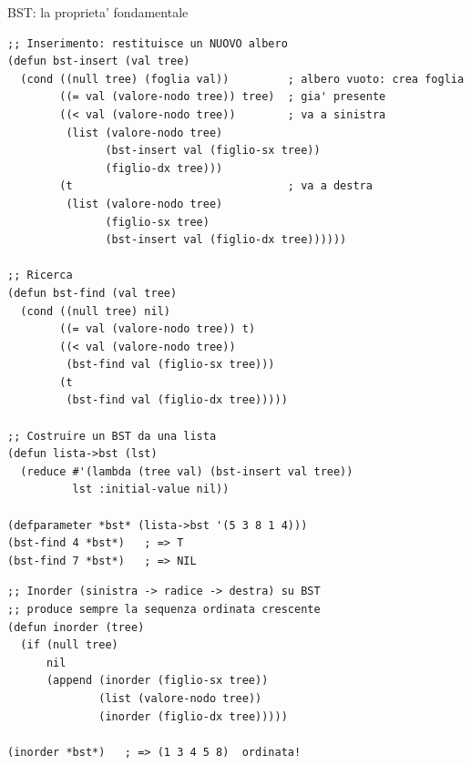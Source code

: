 
\begin{concetto}{BST: la proprieta' fondamentale}

\boxsep
{}
\end{concetto}

\begin{esempio}
\begin{lstlisting}
;; Inserimento: restituisce un NUOVO albero
(defun bst-insert (val tree)
  (cond ((null tree) (foglia val))         ; albero vuoto: crea foglia
        ((= val (valore-nodo tree)) tree)  ; gia' presente
        ((< val (valore-nodo tree))        ; va a sinistra
         (list (valore-nodo tree)
               (bst-insert val (figlio-sx tree))
               (figlio-dx tree)))
        (t                                 ; va a destra
         (list (valore-nodo tree)
               (figlio-sx tree)
               (bst-insert val (figlio-dx tree))))))

;; Ricerca
(defun bst-find (val tree)
  (cond ((null tree) nil)
        ((= val (valore-nodo tree)) t)
        ((< val (valore-nodo tree))
         (bst-find val (figlio-sx tree)))
        (t
         (bst-find val (figlio-dx tree)))))

;; Costruire un BST da una lista
(defun lista->bst (lst)
  (reduce #'(lambda (tree val) (bst-insert val tree))
          lst :initial-value nil))

(defparameter *bst* (lista->bst '(5 3 8 1 4)))
(bst-find 4 *bst*)   ; => T
(bst-find 7 *bst*)   ; => NIL
\end{lstlisting}
\end{esempio}

\begin{esempio}
\begin{lstlisting}
;; Inorder (sinistra -> radice -> destra) su BST
;; produce sempre la sequenza ordinata crescente
(defun inorder (tree)
  (if (null tree)
      nil
      (append (inorder (figlio-sx tree))
              (list (valore-nodo tree))
              (inorder (figlio-dx tree)))))

(inorder *bst*)   ; => (1 3 4 5 8)  ordinata!
\end{lstlisting}
\end{esempio}

